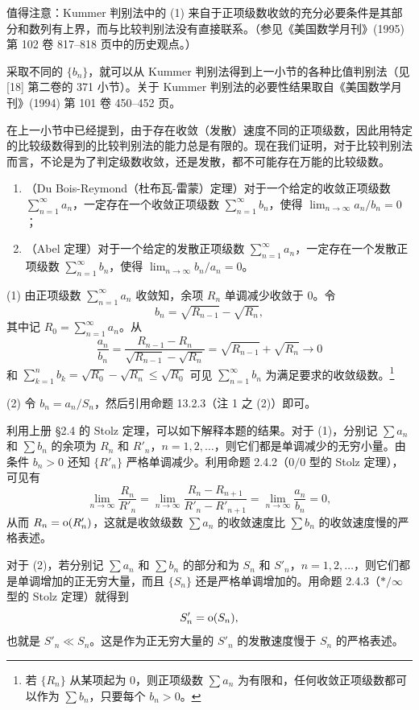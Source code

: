 \begin{xremark}
值得注意：Kummer 判别法中的 (1) 来自于正项级数收敛的充分必要条件是其部分和数列有上界，而与比较判别法没有直接联系。（参见《美国数学月刊》(1995) 第 102 卷 817--818 页中的历史观点。）
\end{xremark}

\begin{xremark}
采取不同的 $\{b_n\}$，就可以从 Kummer 判别法得到上一小节的各种比值判别法（见 [18] 第二卷的 371 小节）。关于 Kummer 判别法的必要性结果取自《美国数学月刊》(1994) 第 101 卷 450--452 页。
\end{xremark}

在上一小节中已经提到，由于存在收敛（发散）速度不同的正项级数，因此用特定的比较级数得到的比较判别法的能力总是有限的。现在我们证明，对于比较判别法而言，不论是为了判定级数收敛，还是发散，都不可能存在万能的比较级数。

\begin{xproposition}[13.2.5]
\begin{enumerate}[label=(\arabic*)]
\item （Du Bois-Reymond（杜布瓦-雷蒙）定理）对于一个给定的收敛正项级数 $\sum_{n=1}^{\infty}a_n$，一定存在一个收敛正项级数 $\sum_{n=1}^{\infty}b_n$，使得 $\lim_{n\to\infty}a_n/b_n=0$；
\item （Abel 定理）对于一个给定的发散正项级数 $\sum_{n=1}^{\infty}a_n$，一定存在一个发散正项级数 $\sum_{n=1}^{\infty}b_n$，使得 $\lim_{n\to\infty}b_n/a_n=0$。
\end{enumerate}
\end{xproposition}
\begin{xproof}
(1) 由正项级数 $\sum_{n=1}^{\infty}a_n$ 收敛知，余项 $R_n$ 单调减少收敛于 0。令
\[
b_n=\sqrt{R_{n-1}}-\sqrt{R_n},
\]
其中记 $R_0=\sum_{n=1}^{\infty}a_n$。从
\[
\frac{a_n}{b_n}=\frac{R_{n-1}-R_n}{\sqrt{R_{n-1}}-\sqrt{R_n}}=\sqrt{R_{n-1}}+\sqrt{R_n}\to0
\]
和 $\sum_{k=1}^{n}b_k=\sqrt{R_0}-\sqrt{R_n}\leq\sqrt{R_0}$ 可见 $\sum_{n=1}^{\infty}b_n$ 为满足要求的收敛级数。\footnote{若 $\{R_n\}$ 从某项起为 0，则正项级数 $\sum a_n$ 为有限和，任何收敛正项级数都可以作为 $\sum b_n$，只要每个 $b_n>0$。}

(2) 令 $b_n=a_n/S_n$，然后引用命题 13.2.3（注 1 之 (2)）即可。
\end{xproof}

\begin{xremark}
利用上册 §2.4 的 Stolz 定理，可以如下解释本题的结果。对于 (1)，分别记 $\sum a_n$ 和 $\sum b_n$ 的余项为 $R_n$ 和 $R'_n$，$n=1,2,\ldots$，则它们都是单调减少的无穷小量。由条件 $b_n>0$ 还知 $\{R'_n\}$ 严格单调减少。利用命题 2.4.2（$0/0$ 型的 Stolz 定理），可见有
\[
\lim_{n\to\infty}\frac{R_n}{R'_n}=\lim_{n\to\infty}\frac{R_n-R_{n+1}}{R'_n-R'_{n+1}}=\lim_{n\to\infty}\frac{a_n}{b_n}=0,
\]
从而 $R_n=\mathrm{o}(R'_n)$，这就是收敛级数 $\sum a_n$ 的收敛速度比 $\sum b_n$ 的收敛速度慢的严格表述。

对于 (2)，若分别记 $\sum a_n$ 和 $\sum b_n$ 的部分和为 $S_n$ 和 $S'_n$，$n=1,2,\ldots$，则它们都是单调增加的正无穷大量，而且 $\{S_n\}$ 还是严格单调增加的。用命题 2.4.3（$*/\infty$ 型的 Stolz 定理）就得到
\[
S'_n=\mathrm{o}(S_n),
\]
也就是 $S'_n\ll S_n$。这是作为正无穷大量的 $S'_n$ 的发散速度慢于 $S_n$ 的严格表述。
\end{xremark}

